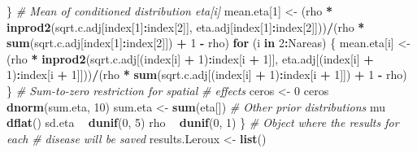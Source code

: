 \documentclass[]{article}
\newenvironment{Shaded}{\begin{snugshade}}{\end{snugshade}}
\newcommand{\KeywordTok}[1]{\textcolor[rgb]{0.13,0.29,0.53}{\textbf{#1}}}
\newcommand{\DecValTok}[1]{\textcolor[rgb]{0.00,0.00,0.81}{#1}}
\newcommand{\StringTok}[1]{\textcolor[rgb]{0.31,0.60,0.02}{#1}}
\newcommand{\CommentTok}[1]{\textcolor[rgb]{0.56,0.35,0.01}{\textit{#1}}}
\newcommand{\ControlFlowTok}[1]{\textcolor[rgb]{0.13,0.29,0.53}{\textbf{#1}}}
\newcommand{\OperatorTok}[1]{\textcolor[rgb]{0.81,0.36,0.00}{\textbf{#1}}}
\newcommand{\NormalTok}[1]{#1}
\begin{document}
\begin{Shaded}
\begin{Highlighting}[]
\NormalTok{    \}}
    \CommentTok{# Mean of conditioned distribution eta[i]}
\NormalTok{    mean.eta[}\DecValTok{1}\NormalTok{] <-}\StringTok{ }\NormalTok{(rho }\OperatorTok{*}\StringTok{ }\KeywordTok{inprod2}\NormalTok{(sqrt.c.adj[index[}\DecValTok{1}\NormalTok{]}\OperatorTok{:}\NormalTok{index[}\DecValTok{2}\NormalTok{]], }
\NormalTok{        eta.adj[index[}\DecValTok{1}\NormalTok{]}\OperatorTok{:}\NormalTok{index[}\DecValTok{2}\NormalTok{]]))}\OperatorTok{/}\NormalTok{(rho }\OperatorTok{*}\StringTok{ }
\StringTok{        }\KeywordTok{sum}\NormalTok{(sqrt.c.adj[index[}\DecValTok{1}\NormalTok{]}\OperatorTok{:}\NormalTok{index[}\DecValTok{2}\NormalTok{]]) }\OperatorTok{+}\StringTok{ }
\StringTok{        }\DecValTok{1} \OperatorTok{-}\StringTok{ }\NormalTok{rho)}
    \ControlFlowTok{for}\NormalTok{ (i }\ControlFlowTok{in} \DecValTok{2}\OperatorTok{:}\NormalTok{Nareas) \{}
\NormalTok{        mean.eta[i] <-}\StringTok{ }\NormalTok{(rho }\OperatorTok{*}\StringTok{ }\KeywordTok{inprod2}\NormalTok{(sqrt.c.adj[(index[i] }\OperatorTok{+}\StringTok{ }
\StringTok{            }\DecValTok{1}\NormalTok{)}\OperatorTok{:}\NormalTok{index[i }\OperatorTok{+}\StringTok{ }\DecValTok{1}\NormalTok{]], eta.adj[(index[i] }\OperatorTok{+}\StringTok{ }
\StringTok{            }\DecValTok{1}\NormalTok{)}\OperatorTok{:}\NormalTok{index[i }\OperatorTok{+}\StringTok{ }\DecValTok{1}\NormalTok{]]))}\OperatorTok{/}\NormalTok{(rho }\OperatorTok{*}\StringTok{ }\KeywordTok{sum}\NormalTok{(sqrt.c.adj[(index[i] }\OperatorTok{+}\StringTok{ }
\StringTok{            }\DecValTok{1}\NormalTok{)}\OperatorTok{:}\NormalTok{index[i }\OperatorTok{+}\StringTok{ }\DecValTok{1}\NormalTok{]]) }\OperatorTok{+}\StringTok{ }\DecValTok{1} \OperatorTok{-}\StringTok{ }\NormalTok{rho)}
\NormalTok{    \}}
    \CommentTok{# Sum-to-zero restriction for spatial}
    \CommentTok{# effects}
\NormalTok{    ceros <-}\StringTok{ }\DecValTok{0}
\NormalTok{    ceros }\OperatorTok{~}\StringTok{ }\KeywordTok{dnorm}\NormalTok{(sum.eta, }\DecValTok{10}\NormalTok{)}
\NormalTok{    sum.eta <-}\StringTok{ }\KeywordTok{sum}\NormalTok{(eta[])}
    \CommentTok{# Other prior distributions}
\NormalTok{    mu }\OperatorTok{~}\StringTok{ }\KeywordTok{dflat}\NormalTok{()}
\NormalTok{    sd.eta }\OperatorTok{~}\StringTok{ }\KeywordTok{dunif}\NormalTok{(}\DecValTok{0}\NormalTok{, }\DecValTok{5}\NormalTok{)}
\NormalTok{    rho }\OperatorTok{~}\StringTok{ }\KeywordTok{dunif}\NormalTok{(}\DecValTok{0}\NormalTok{, }\DecValTok{1}\NormalTok{)}
\NormalTok{\}}
\CommentTok{# Object where the results for each}
\CommentTok{# disease will be saved}
\NormalTok{results.Leroux <-}\StringTok{ }\KeywordTok{list}\NormalTok{()}

\end{Highlighting}
\end{Shaded}
\end{document}
